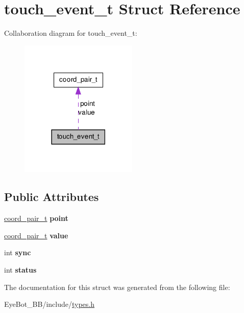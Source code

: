 \hypertarget{structtouch__event__t}{\section{touch\-\_\-event\-\_\-t \-Struct \-Reference}
\label{structtouch__event__t}
}


\-Collaboration diagram for touch\-\_\-event\-\_\-t\-:\nopagebreak
\begin{figure}[H]
\begin{center}
\leavevmode
\includegraphics[width=158pt]{structtouch__event__t__coll__graph}
\end{center}
\end{figure}
\subsection*{\-Public \-Attributes}
\begin{DoxyCompactItemize}
\item 
\hypertarget{structtouch__event__t_a151c4304ad3845a0d2560d8269edb6b2}{\hyperlink{structcoord__pair__t}{coord\-\_\-pair\-\_\-t} {\bfseries point}}\label{structtouch__event__t_a151c4304ad3845a0d2560d8269edb6b2}

\item 
\hypertarget{structtouch__event__t_ae05259d8e34d269e347a44e6a361346c}{\hyperlink{structcoord__pair__t}{coord\-\_\-pair\-\_\-t} {\bfseries value}}\label{structtouch__event__t_ae05259d8e34d269e347a44e6a361346c}

\item 
\hypertarget{structtouch__event__t_a8ce509c5c1afa88d3ffd5c95666fcaf6}{int {\bfseries sync}}\label{structtouch__event__t_a8ce509c5c1afa88d3ffd5c95666fcaf6}

\item 
\hypertarget{structtouch__event__t_a7539deec3b366cc84e0c8c11e5a00af4}{int {\bfseries status}}\label{structtouch__event__t_a7539deec3b366cc84e0c8c11e5a00af4}

\end{DoxyCompactItemize}


\-The documentation for this struct was generated from the following file\-:\begin{DoxyCompactItemize}
\item 
\-Eye\-Bot\-\_\-\-B\-B/include/\hyperlink{types_8h}{types.\-h}\end{DoxyCompactItemize}
